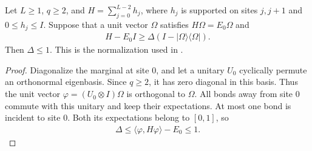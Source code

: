 \begin{lemma}
    \label{thm:chain_positive_nearest_neighbor_gap_upper}
    \leanok
    Let $L\ge1$, $q\ge2$, and
    $H=\sum_{j=0}^{L-2}h_j$, where $h_j$ is supported on sites $j,j+1$ and
    $0\le h_j\le I$. Suppose that a unit vector $\Omega$ satisfies
    $H\Omega=E_0\Omega$ and
    \begin{align*}
        H-E_0I\ge\Delta(I-|\Omega\rangle\langle\Omega|).
    \end{align*}
    Then $\Delta\le1$. This is the normalization used in
    \cite[Section~5, before equation~(4)]{Arad2013AreaLaw}.
\end{lemma}
\begin{proof}
    \leanok
    Diagonalize the marginal at site $0$, and let a unitary $U_0$ cyclically
    permute an orthonormal eigenbasis. Since $q\ge2$, it has zero diagonal
    in this basis. Thus the unit vector $\varphi=(U_0\otimes I)\Omega$
    is orthogonal to $\Omega$.
    All bonds away from site $0$ commute with this unitary and keep their
    expectations. At most one bond is incident to site $0$. Both its
    expectations belong to $[0,1]$, so
    \begin{align*}
        \Delta\le\langle\varphi,H\varphi\rangle-E_0\le1.
    \end{align*}
\end{proof}

